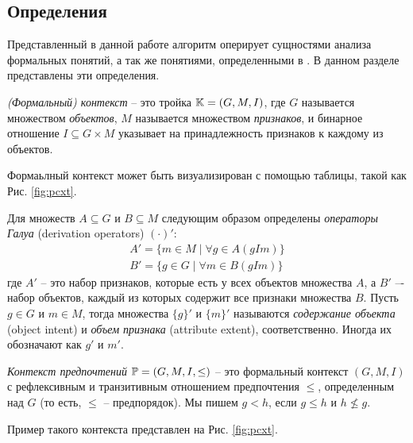 	\subsection{Определения}
	\label{subsection:definitions}
		Представленный в данной работе алгоритм оперирует сущностями анализа формальных понятий\cite{Ganter:1999}, а так же понятиями, определенными в \cite{Obiedkov:2012:preferences,Obiedkov:2012:modeling}. В данном разделе представлены эти определения.
		
		
		\begin{definition}
			\emph{(Формальный) контекст} – это тройка $\mathbb{K} = (G, M, I)$, где $G$ называется множеством \emph{объектов}, $M$ называется множеством \emph{признаков}, и бинарное отношение ${I \subseteq G \times M}$ указывает на принадлежность признаков к каждому из объектов.
		\end{definition}
		
		Формаьлный контекст может быть визуализирован с помощью таблицы, такой как Рис. \ref{fig:pcxt}.
		
		Для множеств $A \subseteq G$ и $B \subseteq M$ следующим образом определены \emph{операторы Галуа} (derivation operators) $(\cdot)'$:
		\begin{subequations}
			\begin{gather}
			\label{eq:object_intent}
			A'=\{m \in M \mid \forall g \in A (g I m)\}  \\ 
			\label{eq:attribute_extent}
			B'=\{g \in G \mid \forall m \in B (g I m)\}
			\end{gather}
		\end{subequations}
		где $A'$ – это набор признаков, которые есть у всех объектов множества $A$, а $B'$  –- набор объектов, каждый из которых содержит все признаки множества $B$. Пусть $g \in G$ и $m \in M$, тогда множества $\{g\}'$ и $\{m\}'$ называются \emph{содержание объекта} (object intent) и \emph{объем признака} (attribute extent), соответственно. Иногда их обозначают как $g'$ и $m'$.
		
		\begin{definition}
			\emph{Контекст предпочтений} $\mathbb{P} = (G, M, I, \leq)$ – это формальный контекст $(G, M, I)$ с рефлексивным и транзитивным отношением предпочтения $\leq$, определенным над $G$ (то есть, $\leq$ – предпорядок). Мы пишем $g < h$, если $g \leq h$ и $h \not\leq g$.
		\end{definition}
		
		Пример такого контекста представлен на Рис. \ref{fig:pcxt}.
		
